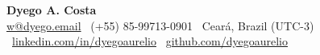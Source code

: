 


\begin{center}
  {\Large\bfseries Dyego A. Costa}\\[2pt]
  {\small
    \href{mailto:w@dyego.email}{w@dyego.email} \textbar\
    (+55) 85-99713-0901 \textbar\
    Ceará, Brazil (UTC-3) \textbar\
    \href{https://linkedin.com/in/dyegoaurelio}{linkedin.com/in/dyegoaurelio} \textbar\
    \href{https://github.com/dyegoaurelio}{github.com/dyegoaurelio}
  }
\end{center}

\vspace{-4pt}







